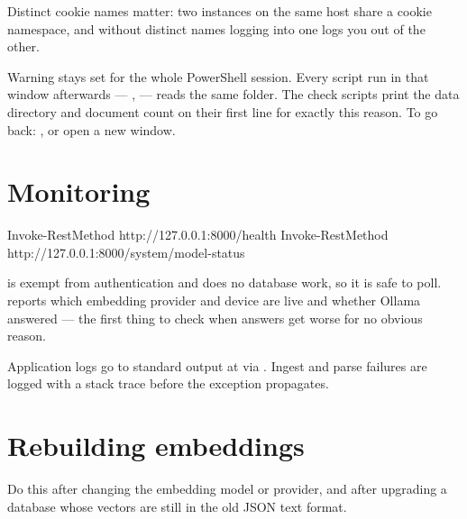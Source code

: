 
Distinct cookie names matter: two instances on the same host share a cookie
namespace, and without distinct names logging into one logs you out of the
other.

\begin{callout}{Warning}
 stays set for the whole PowerShell session. Every
script run in that window afterwards --- ,
 --- reads the same folder. The check
scripts print the data directory and document count on their first line for
exactly this reason. To go back:
, or open a new
window.
\end{callout}

\section{Monitoring}

\begin{shellblock}
Invoke-RestMethod http://127.0.0.1:8000/health
Invoke-RestMethod http://127.0.0.1:8000/system/model-status
\end{shellblock}

 is exempt from authentication and does no database work, so it is
safe to poll.  reports which embedding provider and
device are live and whether Ollama answered --- the first thing to check when
answers get worse for no obvious reason.

Application logs go to standard output at  via
. Ingest and parse failures are logged with a stack
trace before the exception propagates.

\section{Rebuilding embeddings}
\label{sec:rebuild-embeddings}

Do this after changing the embedding model or provider, and after upgrading a
database whose vectors are still in the old JSON text format.

